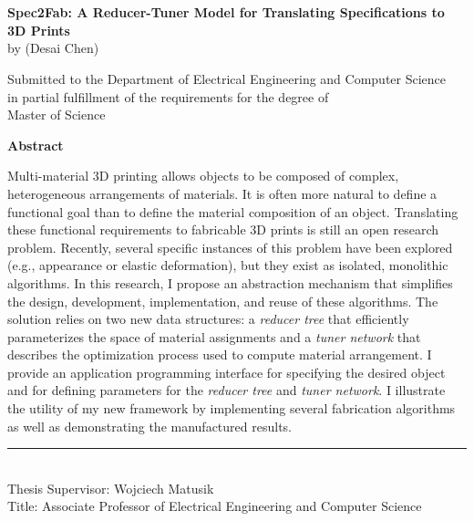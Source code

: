 \chapter*{}
\label{chap:abstract}
\begin{center}
\vspace{-8em}
{\large \textsf{\textbf{Spec2Fab: A Reducer-Tuner Model for Translating Specifications to 3D Prints}}} \\
by (Desai Chen)

\vspace{.2in}

Submitted to the Department of Electrical Engineering and Computer Science \\
in partial fulfillment of the requirements for the degree of \\
Master of Science \\ %
\end{center}

\noindent\textsf{\textbf{Abstract}}

\noindent Multi-material 3D printing allows objects to be composed of complex, heterogeneous arrangements of materials.
It is often more natural to define a functional goal than to define the material composition of an object.
Translating these functional requirements to fabricable 3D prints is still an open research problem.
Recently, several specific instances of this problem have been explored
(e.g.,  appearance or elastic deformation),
but they exist as isolated, monolithic algorithms.
In this research, I propose an abstraction mechanism that simplifies the design, development, implementation, and reuse of these algorithms.
The solution relies on two new data structures:
a \emph{reducer tree} that efficiently parameterizes the space of material assignments
and a \emph{tuner network} that describes the optimization process used to compute material arrangement.
I provide an application programming interface for specifying the desired object and for defining parameters
for the \emph{reducer tree} and \emph{tuner network}. I illustrate the utility of my new framework
by implementing several fabrication algorithms as well as demonstrating the manufactured results.

\noindent\rule[0.5ex]{2in}{1pt} \\
Thesis Supervisor: Wojciech Matusik\\
Title:  Associate Professor of Electrical Engineering and Computer Science



